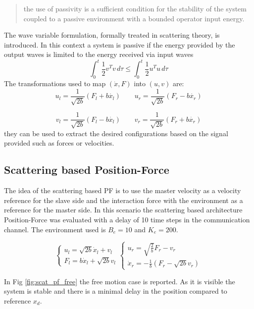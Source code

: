 \documentclass[a4paper,12pt]{article}
\begin{document}
\begin{quote}
    the use of passivity is a sufficient condition for the stability of the system coupled to a passive environment with a bounded operator input energy.
\end{quote}

\noindent The wave variable formulation, formally treated in scattering theory, is introduced. In this context a system is passive if the energy provided by the output waves is limited to the energy received via input waves
\[
    \int_{0}^{t} \frac{1}{2}v^Tv \,d\tau \leq \int_{0}^{t} \frac{1}{2}u^Tu \,d\tau 
\]
The transformations used to map $(\dot{x},F)$ into $(u,v)$ are:
\[
    u_l = \frac{1}{\sqrt{2b}}(F_l + b \dot{x_l}) \qquad u_r = \frac{1}{\sqrt{2b}}(F_r - b \dot{x_r}) 
\]

\[
    v_l = \frac{1}{\sqrt{2b}}(F_l - b \dot{x_l}) \qquad v_r = \frac{1}{\sqrt{2b}}(F_r + b \dot{x_r}) 
\]
they can be used to extract the desired configurations based on the signal provided such as forces or velocities.

\newpage
\subsection{Scattering based Position-Force}

The idea of the scattering based PF is to use the master velocity as a velocity reference for the slave side and the interaction force with the environment as a reference for the master side. In this scenario the scattering based architecture Position-Force was evaluated with a delay of 10 time steps in the communication channel. The environment used is $B_e = 10$ and $K_e = 200$. 

\[
    \begin{cases}
    u_l=\sqrt{2b}\dot{x}_l+v_l\\
    F_l=b\dot{x}_l+\sqrt{2b}v_l
    \end{cases}
    \begin{cases}
    u_r=\sqrt{\frac{2}{b}}F_r-v_r\\
    \dot{x}_r=-\frac{1}{b}(F_r-\sqrt{2b}v_r)
    \end{cases}
\]

\bigskip
In Fig \ref{fig:scat_pf_free} the free motion case is reported. As it is visible the system is stable and there is a minimal delay in the position compared to reference $x_d$.
\end{document}
